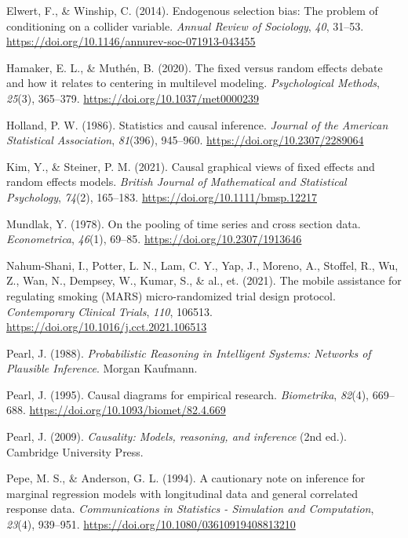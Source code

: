 \documentclass[
  11pt,
  a4paper,
]{article}
\newlength{\cslhangindent}
\newenvironment{CSLReferences}[2] %
 {\begin{list}{}{%
  \setlength{\itemindent}{0pt}
  \setlength{\leftmargin}{0pt}
  \setlength{\parsep}{0pt}
  \ifodd #1
   \setlength{\leftmargin}{\cslhangindent}
   \setlength{\itemindent}{-1\cslhangindent}
  \fi
  \setlength{\itemsep}{#2\baselineskip}}}
 {\end{list}}
\begin{document}
\begin{CSLReferences}{1}{0}
Elwert, F., \& Winship, C. (2014). Endogenous selection bias: The
problem of conditioning on a collider variable. \emph{Annual Review of
Sociology}, \emph{40}, 31--53.
\url{https://doi.org/10.1146/annurev-soc-071913-043455}

Hamaker, E. L., \& Muthén, B. (2020). The fixed versus random effects
debate and how it relates to centering in multilevel modeling.
\emph{Psychological Methods}, \emph{25}(3), 365--379.
\url{https://doi.org/10.1037/met0000239}

Holland, P. W. (1986). Statistics and causal inference. \emph{Journal of
the American Statistical Association}, \emph{81}(396), 945--960.
\url{https://doi.org/10.2307/2289064}

Kim, Y., \& Steiner, P. M. (2021). Causal graphical views of fixed
effects and random effects models. \emph{British Journal of Mathematical
and Statistical Psychology}, \emph{74}(2), 165--183.
\url{https://doi.org/10.1111/bmsp.12217}

Mundlak, Y. (1978). On the pooling of time series and cross section
data. \emph{Econometrica}, \emph{46}(1), 69--85.
\url{https://doi.org/10.2307/1913646}

Nahum-Shani, I., Potter, L. N., Lam, C. Y., Yap, J., Moreno, A.,
Stoffel, R., Wu, Z., Wan, N., Dempsey, W., Kumar, S., \& al., et.
(2021). The mobile assistance for regulating smoking (MARS)
micro-randomized trial design protocol. \emph{Contemporary Clinical
Trials}, \emph{110}, 106513.
\url{https://doi.org/10.1016/j.cct.2021.106513}

Pearl, J. (1988). \emph{Probabilistic Reasoning in Intelligent Systems:
Networks of Plausible Inference}. Morgan Kaufmann.

Pearl, J. (1995). Causal diagrams for empirical research.
\emph{Biometrika}, \emph{82}(4), 669--688.
\url{https://doi.org/10.1093/biomet/82.4.669}

Pearl, J. (2009). \emph{Causality: Models, reasoning, and inference}
(2nd ed.). Cambridge University Press.

Pepe, M. S., \& Anderson, G. L. (1994). A cautionary note on inference
for marginal regression models with longitudinal data and general
correlated response data. \emph{Communications in Statistics -
Simulation and Computation}, \emph{23}(4), 939--951.
\url{https://doi.org/10.1080/03610919408813210}


\end{CSLReferences}
\end{document}
